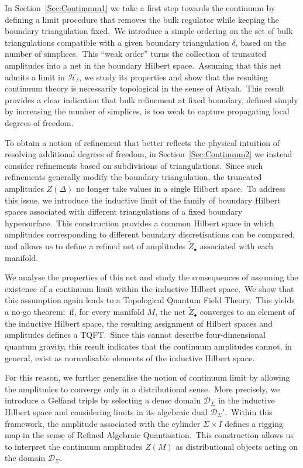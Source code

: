 \documentclass[11pt]{article}
\theoremstyle{definition}
\numberwithin{equation}{section}
\begin{document}
In Section~\ref{Sec:Continuum1} we take a first step towards the continuum by defining a limit procedure that removes the bulk regulator while keeping the boundary triangulation fixed.~We introduce a simple ordering on the set of bulk triangulations compatible with a given boundary triangulation $\delta$, based on the number of simplices.~This ``weak order'' turns the collection of truncated amplitudes into a net in the boundary Hilbert space.~Assuming that this net admits a limit in $\mathcal H_\delta$, we study its properties and show that the resulting continuum theory is necessarily topological in the sense of Atiyah.~This result provides a clear indication that bulk refinement at fixed boundary, defined simply by increasing the number of simplices, is too weak to capture propagating local degrees of freedom.

To obtain a notion of refinement that better reflects the physical intuition of resolving additional degrees of freedom, in Section~\ref{Sec:Continuum2} we instead consider refinements based on subdivisions of triangulations.~Since such refinements generally modify the boundary triangulation, the truncated amplitudes $Z(\Delta)$ no longer take values in a single Hilbert space.~To address this issue, we introduce the inductive limit of the family of boundary Hilbert spaces associated with different triangulations of a fixed boundary hypersurface.~This construction provides a common Hilbert space in which amplitudes corresponding to different boundary discretisations can be compared, and allows us to define a refined net of amplitudes $\tilde Z_\bullet$ associated with each manifold.

We analyse the properties of this net and study the consequences of assuming the existence of a continuum limit within the inductive Hilbert space.~We show that this assumption again leads to a Topological Quantum Field Theory.~This yields a no-go theorem:~if, for every manifold $M$, the net $\tilde Z_\bullet$ converges to an element of the inductive Hilbert space, the resulting assignment of Hilbert spaces and amplitudes defines a TQFT.~Since this cannot describe four-dimensional quantum gravity, this result indicates that the continuum amplitudes cannot, in general, exist as normalisable elements of the inductive Hilbert space.

For this reason, we further generalise the notion of continuum limit by allowing the amplitudes to converge only in a distributional sense.~More precisely, we introduce a Gelfand triple by selecting a dense domain $\mathcal D_\Sigma$ in the inductive Hilbert space and considering limits in its algebraic dual $\mathcal D_\Sigma'$.~Within this framework, the amplitude associated with the cylinder $\Sigma\times I$ defines a rigging map in the sense of Refined Algebraic Quantisation.~This construction allows us to interpret the continuum amplitudes $Z(M)$ as distributional objects acting on the domain $\mathcal D_\Sigma$.
\end{document}
